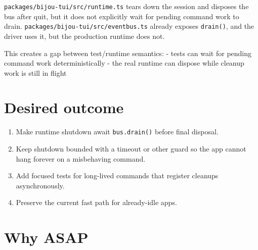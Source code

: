 \texttt{p\allowbreak{}a\allowbreak{}c\allowbreak{}k\allowbreak{}a\allowbreak{}g\allowbreak{}e\allowbreak{}s\allowbreak{}/\allowbreak{}b\allowbreak{}i\allowbreak{}j\allowbreak{}o\allowbreak{}u\allowbreak{}-\allowbreak{}t\allowbreak{}u\allowbreak{}i\allowbreak{}/\allowbreak{}s\allowbreak{}r\allowbreak{}c\allowbreak{}/\allowbreak{}r\allowbreak{}u\allowbreak{}n\allowbreak{}t\allowbreak{}i\allowbreak{}m\allowbreak{}e\allowbreak{}.\allowbreak{}t\allowbreak{}s} tears down the session and disposes the bus after quit, but it does not explicitly wait for pending command work to drain. \texttt{p\allowbreak{}a\allowbreak{}c\allowbreak{}k\allowbreak{}a\allowbreak{}g\allowbreak{}e\allowbreak{}s\allowbreak{}/\allowbreak{}b\allowbreak{}i\allowbreak{}j\allowbreak{}o\allowbreak{}u\allowbreak{}-\allowbreak{}t\allowbreak{}u\allowbreak{}i\allowbreak{}/\allowbreak{}s\allowbreak{}r\allowbreak{}c\allowbreak{}/\allowbreak{}e\allowbreak{}v\allowbreak{}e\allowbreak{}n\allowbreak{}t\allowbreak{}b\allowbreak{}u\allowbreak{}s\allowbreak{}.\allowbreak{}t\allowbreak{}s} already exposes \texttt{d\allowbreak{}r\allowbreak{}a\allowbreak{}i\allowbreak{}n\allowbreak{}(\allowbreak{})}, and the driver uses it, but the production runtime does not.

This creates a gap between test/runtime semantics: - tests can wait for pending command work deterministically - the real runtime can dispose while cleanup work is still in flight

\section{Desired outcome}\label{record-384-desired-outcome}

\begin{enumerate}
\def\labelenumi{\arabic{enumi}.}
\tightlist
\item
  Make runtime shutdown await \texttt{b\allowbreak{}u\allowbreak{}s\allowbreak{}.\allowbreak{}d\allowbreak{}r\allowbreak{}a\allowbreak{}i\allowbreak{}n\allowbreak{}(\allowbreak{})} before final disposal.
\item
  Keep shutdown bounded with a timeout or other guard so the app cannot hang forever on a misbehaving command.
\item
  Add focused tests for long-lived commands that register cleanups asynchronously.
\item
  Preserve the current fast path for already-idle apps.
\end{enumerate}

\section{Why ASAP}\label{record-384-why-asap}

